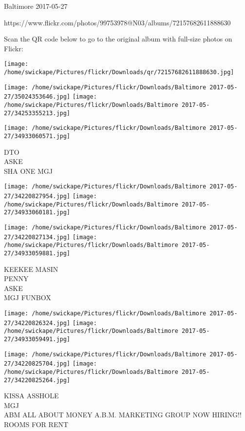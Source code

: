 \documentclass[10pt,letterpaper]{article}
\begin{document}
Baltimore 2017-05-27

https://www.flickr.com/photos/99753978@N03/albums/72157682611888630

Scan the QR code below to go to the original album with full-size photos on Flickr:

\texttt{[image: /home/swickape/Pictures/flickr/Downloads/qr/72157682611888630.jpg]}
\pagebreak

\texttt{[image: /home/swickape/Pictures/flickr/Downloads/Baltimore 2017-05-27/35024353646.jpg]}
\texttt{[image: /home/swickape/Pictures/flickr/Downloads/Baltimore 2017-05-27/34253355213.jpg]}

\vspace{0.25in}
\texttt{[image: /home/swickape/Pictures/flickr/Downloads/Baltimore 2017-05-27/34933060571.jpg]}

DTO\\
ASKE\\
SHA ONE MGJ
\pagebreak

\texttt{[image: /home/swickape/Pictures/flickr/Downloads/Baltimore 2017-05-27/34220827954.jpg]}
\texttt{[image: /home/swickape/Pictures/flickr/Downloads/Baltimore 2017-05-27/34933060181.jpg]}

\texttt{[image: /home/swickape/Pictures/flickr/Downloads/Baltimore 2017-05-27/34220827134.jpg]}
\texttt{[image: /home/swickape/Pictures/flickr/Downloads/Baltimore 2017-05-27/34933059881.jpg]}

KEEKEE MASIN\\
PENNY\\
ASKE\\
MGJ FUNBOX
\pagebreak

\texttt{[image: /home/swickape/Pictures/flickr/Downloads/Baltimore 2017-05-27/34220826324.jpg]}
\texttt{[image: /home/swickape/Pictures/flickr/Downloads/Baltimore 2017-05-27/34933059491.jpg]}

\texttt{[image: /home/swickape/Pictures/flickr/Downloads/Baltimore 2017-05-27/34220825704.jpg]}
\texttt{[image: /home/swickape/Pictures/flickr/Downloads/Baltimore 2017-05-27/34220825264.jpg]}

KISSA ASSHOLE\\
MGJ\\
ABM ALL ABOUT MONEY A.B.M. MARKETING GROUP NOW HIRING!!\\
ROOMS FOR RENT
\pagebreak
\end{document}
